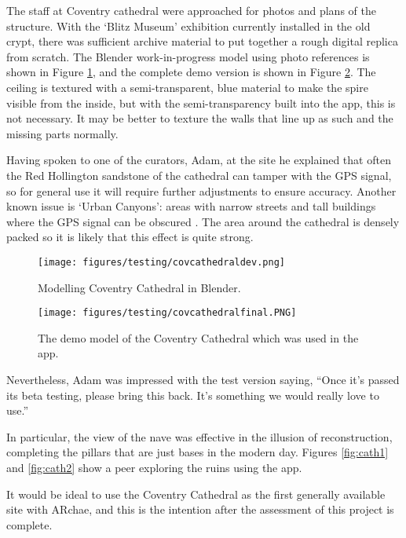 \documentclass[12pt, a4paper]{article}
\begin{document}
The staff at Coventry cathedral were approached for photos and plans of the structure. With the `Blitz Museum' exhibition currently installed in the old crypt, there was sufficient archive material to put together a rough digital replica from scratch. The Blender work-in-progress model using photo references is shown in Figure \ref{fig:covdev}, and the complete demo version is shown in Figure \ref{fig:covfinal}. The ceiling is textured with a semi-transparent, blue material to make the spire visible from the inside, but with the semi-transparency built into the app, this is not necessary. It may be better to texture the walls that line up as such and the missing parts normally. 

Having spoken to one of the curators, Adam, at the site he explained that often the Red Hollington sandstone of the cathedral can tamper with the GPS signal, so for general use it will require further adjustments to ensure accuracy. Another known issue is `Urban Canyons': areas with narrow streets and tall buildings where the GPS signal can be obscured \cite{testing:urbancanyon}. The area around the cathedral is densely packed so it is likely that this effect is quite strong.

\begin{figure}[h]
\centering
    \texttt{[image: figures/testing/covcathedraldev.png]}
        \caption{Modelling Coventry Cathedral in Blender.}
        \label{fig:covdev}
\end{figure}

\begin{figure}[H]
\centering
    \texttt{[image: figures/testing/covcathedralfinal.PNG]}
        \caption{The demo model of the Coventry Cathedral  which was used in the app.}
        \label{fig:covfinal}
\end{figure}

Nevertheless, Adam was impressed with the test version saying, ``Once it’s passed its beta testing, please bring this back. It’s something we would really love to use.''

In particular, the view of the nave was effective in the illusion of reconstruction, completing the pillars that are just bases in the modern day. Figures \ref{fig:cath1} and \ref{fig:cath2} show a peer exploring the ruins using the app.

It would be ideal to use the Coventry Cathedral as the first generally available site with ARchae, and this is the intention after the assessment of this project is complete.
\end{document}
